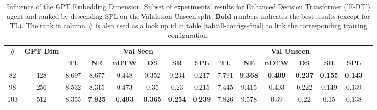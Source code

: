 \begin{table}
\centering
\caption{\label{tab:e_dt_dim_test}Influence of the GPT Embedding Dimension. Subset of experiments' results for Enhanced Decision Transformer ('E-DT') agent and ranked by descending SPL on the Validation Unseen split. \textbf{Bold} numbers indicates the best results (except for TL). The rank in column \# is also used as a look up id in table \ref{tab:all-configs-final} to link the corresponding training configuration.}
\begin{tabular}{@{\hskip3pt}c@{\hskip3pt}c@{\hskip3pt}c@{\hskip3pt}c@{\hskip3pt}c@{\hskip3pt}c@{\hskip3pt}c@{\hskip3pt}c@{\hskip3pt}c@{\hskip3pt}c@{\hskip3pt}c@{\hskip3pt}c@{\hskip3pt}c@{\hskip3pt}c@{\hskip3pt}c}
\toprule
                                  \textbf{\#} & \textbf{GPT Dim} & \multicolumn{6}{c}{\textbf{Val Seen}} & \multicolumn{6}{c}{\textbf{Val Unseen}} \\
\cmidrule(l){3-8}\cmidrule(l){9-14}\textbf{~} &       \textbf{~} &       \textbf{TL} &     \textbf{NE} &   \textbf{nDTW} &     \textbf{OS} &     \textbf{SR} &    \textbf{SPL} &         \textbf{TL} &     \textbf{NE} &   \textbf{nDTW} &     \textbf{OS} &     \textbf{SR} &    \textbf{SPL} \\
\midrule
                                           82 &              128 &             8.697 &           8.677 &           0.448 &           0.352 &           0.234 &           0.217 &               7.791 &  \textbf{9.368} &  \textbf{0.409} &  \textbf{0.237} &  \textbf{0.155} &  \textbf{0.143} \\
                                           98 &              256 &             8.532 &           8.315 &           0.473 &            0.35 &            0.23 &           0.215 &               7.445 &           9.415 &           0.403 &           0.222 &           0.149 &           0.139 \\
                                          103 &              512 &             8.355 &  \textbf{7.925} &  \textbf{0.493} &  \textbf{0.365} &  \textbf{0.254} &  \textbf{0.239} &               7.826 &           9.578 &            0.39 &            0.22 &            0.15 &           0.138 \\
\bottomrule
\end{tabular}
\end{table}
